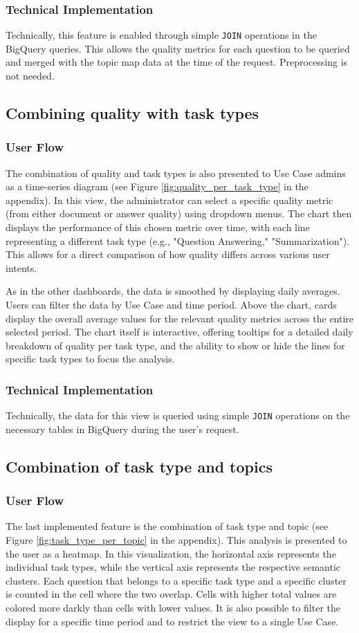 \documentclass[
	english,
	ruledheaders=section,%
	class=report,%
	thesis={type=bachelor},%
	accentcolor=1b,%
	custommargins=true,%
	marginpar=false,%
	parskip=half-,%
	fontsize=11pt,%
	DIV=14,
]{tudapub}
\begin{document}
\subsubsection{Technical Implementation}
Technically, this feature is enabled through simple \texttt{JOIN} operations in the BigQuery queries. This allows the quality metrics for each question to be queried and merged with the topic map data at the time of the request. Preprocessing is not needed.
\subsection{Combining quality with task types}
\subsubsection{User Flow}
The combination of quality and task types is also presented to Use Case admins as a time-series diagram (see Figure \ref{fig:quality_per_task_type} in the appendix). In this view, the administrator can select a specific quality metric (from either document or answer quality) using dropdown menus. The chart then displays the performance of this chosen metric over time, with each line representing a different task type (e.g., "Question Answering," "Summarization"). This allows for a direct comparison of how quality differs across various user intents.

As in the other dashboards, the data is smoothed by displaying daily averages. Users can filter the data by Use Case and time period. Above the chart, cards display the overall average values for the relevant quality metrics across the entire selected period. The chart itself is interactive, offering tooltips for a detailed daily breakdown of quality per task type, and the ability to show or hide the lines for specific task types to focus the analysis.

\subsubsection{Technical Implementation}
Technically, the data for this view is queried using simple \texttt{JOIN} operations on the necessary tables in BigQuery during the user's request.
\subsection{Combination of task type and topics}
\subsubsection{User Flow}
The last implemented feature is the combination of task type and topic (see Figure  \ref{fig:task_type_per_topic} in the appendix). This analysis is presented to the user as a heatmap. In this visualization, the horizontal axis represents the individual task types, while the vertical axis represents the respective semantic clusters. Each question that belongs to a specific task type and a specific cluster is counted in the cell where the two overlap. Cells with higher total values are colored more darkly than cells with lower values. It is also possible to filter the display for a specific time period and to restrict the view to a single Use Case.
\end{document}

